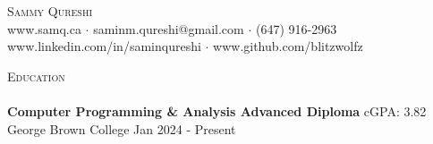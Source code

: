 \documentclass[a4paper]{article}
\newcommand{\lineunder} {
    \vspace*{-8pt} \\
    \hspace*{-18pt} \hrulefill \\
}
\newcommand{\header} [1] {
    {\hspace*{-18pt}\vspace*{6pt} \textsc{#1}}
    \vspace*{-6pt} \lineunder
}
\begin{document}
\vspace*{-40pt}

\vspace*{-10pt}
\begin{center}
    {\Huge \scshape {Sammy Qureshi}}\\
    www.samq.ca $\cdot$ saminm.qureshi@gmail.com $\cdot$ (647) 916-2963 \\
    www.linkedin.com/in/saminqureshi $\cdot$ www.github.com/blitzwolfz\\
\end{center}

\header{Education}
\textbf{Computer Programming \& Analysis Advanced Diploma} \hfill cGPA: 3.82\\ 
George Brown College \hfill Jan 2024 - Present\\
\vspace{1mm}
\vspace{4mm}
\end{document}
